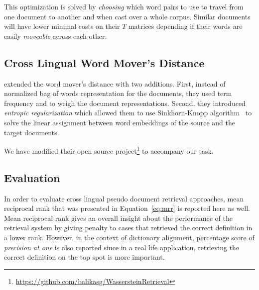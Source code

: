 This optimization is solved by \emph{choosing} which word pairs to use to travel from one document to another and when cast over a whole corpus.
Similar documents will have lower minimal costs on their $T$ matrices depending if their words are easily \emph{moveable} across each other.

\subsection{Cross Lingual Word Mover's Distance}%
\label{sub:clemd}

\textcite{balikas_cross-lingual_2018} extended the word mover's distance with two additions.
First, instead of normalized bag of words representation for the documents, they used term frequency and \tfidf{} to weigh the document representations.
Second, they introduced \emph{entropic regularization} which allowed them to use Sinkhorn-Knopp algorithm~\cite{sinkhorn_concerning_1967} to solve the linear assignment between word embeddings of the source and the target documents.

We have modified their open source project\footnote{\url{https://github.com/balikasg/WassersteinRetrieval}} to accompany our task.

\subsection{Evaluation}%
\label{sub:cldr_evaluation}

In order to evaluate cross lingual pseudo document retrieval approaches, mean reciprocal rank that was presented in Equation~\ref{eq:mrr} is reported here as well.
Mean reciprocal rank gives an overall insight about the performance of the retrieval system by giving penalty to cases that retrieved the correct definition in a lower rank.
However, in the context of dictionary alignment, percentage score of \emph{precision at one} is also reported since in a real life application, retrieving the correct definition on the top spot is more important.

